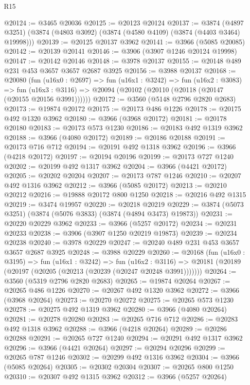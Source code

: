 \begin{lexlean}{R15}
\begin{coremodule}
@20124 := @3465 @20036
@20125 := @20123 @20124
@20137 := @3874
    (@4897 @3251)
    (@3874 (@4803 @3092) (@3874 (@4580 @4109) (@3874 (@4403 @3464) @19998)))
@20139 := @20125 @20137 @3962
@20141 := @3966 (@5085 @20085)
@20142 := @20139 @20141
@20146 := @3906 (@3907 @1246 @20124 @19998)
@20147 := @20142 @20146
@20148 := @3978 @20137
@20155 := @20148 @489 @231 @453 @3657 @3657 @2687 @3925
@20156 := @3988 @20137
@20168 := @20080
    (fun (u16x0 : @2697) =>
    fun (u16x1 : @3242) =>
    fun (u16x2 : @3083) =>
    fun (u16x3 : @3116) => @20094 (@20102 (@20110 (@20118 (@20147 (@20155 @20156 @3991))))))
@20172 := @3560 (@5148 @2796 @2820 @2683)
@20173 := @19874 @20172
@20175 := @20173 @486 @1226
@20178 := @20175 @492 @1320 @3962
@20180 := @3966 (@3968 @20172)
@20181 := @20178 @20180
@20183 := @20173 @573 @1230
@20186 := @20183 @492 @1319 @3962
@20188 := @3966 (@4080 @20172)
@20189 := @20186 @20188
@20191 := @20173 @716 @712
@20194 := @20191 @492 @1318 @3962
@20196 := @3966 (@4218 @20172)
@20197 := @20194 @20196
@20199 := @20173 @727 @1240
@20202 := @20199 @492 @1317 @3962
@20204 := @3966 (@4421 @20172)
@20205 := @20202 @20204
@20207 := @20173 @787 @1246
@20210 := @20207 @492 @1316 @3962
@20212 := @3966 (@5085 @20172)
@20213 := @20210 @20212
@20216 := @19888 @20172 @800 @1250
@20218 := @20216 @492 @1315
@20219 := @3474 @19957
@20220 := @20218 @20219
@20229 := @3874 (@5073 @3251) (@3874 (@5076 @3833) (@3874 (@4894 @3473) @19873))
@20231 := @20220 @20229 @3962
@20233 := @3966 (@5257 @20172)
@20234 := @20231 @20233
@20238 := @3906 (@3907 @1250 @20219 @19873)
@20239 := @20234 @20238
@20240 := @3978 @20229
@20247 := @20240 @489 @231 @453 @3657 @3657 @2687 @3925
@20248 := @3988 @20229
@20260 := @20168
    (fun (u16x0 : @3195) =>
    fun (u16x1 : @3242) =>
    fun (u16x2 : @3116) =>
    @20181 (@20189 (@20197 (@20205 (@20213 (@20239 (@20247 @20248 @3991)))))))
@20264 := @3560 (@5319 @2796 @2820 @2683)
@20265 := @19874 @20264
@20267 := @20265 @486 @1226
@20270 := @20267 @492 @1320 @3962
@20272 := @3966 (@3968 @20264)
@20273 := @20270 @20272
@20275 := @20265 @573 @1230
@20278 := @20275 @492 @1319 @3962
@20280 := @3966 (@4080 @20264)
@20281 := @20278 @20280
@20283 := @20265 @716 @712
@20286 := @20283 @492 @1318 @3962
@20288 := @3966 (@4218 @20264)
@20289 := @20286 @20288
@20291 := @20265 @727 @1240
@20294 := @20291 @492 @1317 @3962
@20296 := @3966 (@4421 @20264)
@20297 := @20294 @20296
@20299 := @20265 @787 @1246
@20302 := @20299 @492 @1316 @3962
@20304 := @3966 (@5085 @20264)
@20305 := @20302 @20304
@20307 := @20265 @800 @1250
@20310 := @20307 @492 @1315 @3962
@20312 := @3966 (@5257 @20264)

\end{coremodule}
\end{lexlean}
